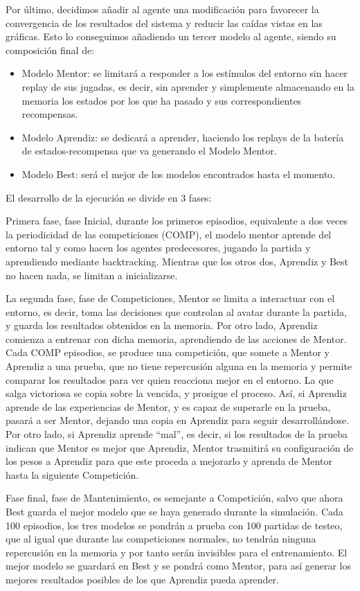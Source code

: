 Por último, decidimos añadir al agente una modificación para favorecer la convergencia de los resultados del sistema y reducir las caídas vistas en las gráficas.
Esto lo conseguimos añadiendo un tercer modelo al agente, siendo su composición final de:
\begin{itemize}
 \item Modelo Mentor: se limitará a responder a los estímulos del entorno sin hacer replay de sus jugadas, es decir, sin aprender y simplemente almacenando en la memoria los estados por los que ha pasado y sus correspondientes recompensas.
 \item Modelo Aprendiz: se dedicará a aprender, haciendo los replays de la batería de estados-recompensa que va generando el Modelo Mentor.
 \item Modelo Best: será el mejor de los modelos encontrados hasta el momento. 
\end{itemize}
El desarrollo de la ejecución se divide en 3 fases:

Primera fase, fase Inicial, durante los primeros episodios, equivalente a dos veces la periodicidad de las competiciones (COMP), el modelo mentor aprende del entorno tal y como hacen los agentes predecesores, jugando la partida y aprendiendo mediante backtracking. Mientras que los otros dos, Aprendiz y Best no hacen nada, se limitan a inicializarse.

La segunda fase, fase de Competiciones, Mentor se limita a interactuar con el entorno, es decir, toma las decisiones que controlan al avatar durante la partida, y guarda los resultados obtenidos en la memoria. Por otro lado, Aprendiz comienza a entrenar con dicha memoria, aprendiendo de las acciones de Mentor.
Cada COMP episodios, se produce una competición, que somete a Mentor y Aprendiz a una prueba, que no tiene repercusión alguna en la memoria y permite comparar los resultados para ver quien reacciona mejor en el entorno. La que salga victoriosa se copia sobre la vencida, y prosigue el proceso.
Así, si Aprendiz aprende de las experiencias de Mentor, y es capaz de superarle en la prueba, pasará a ser Mentor, dejando una copia en Aprendiz para seguir desarrollándose. Por otro lado, si Aprendiz aprende “mal”, es decir, si los resultados de la prueba indican que Mentor es mejor que Aprendiz, Mentor trasmitirá su configuración de los pesos a Aprendiz para que este proceda a mejorarlo y aprenda de Mentor hasta la siguiente Competición.  

Fase final, fase de Mantenimiento, es semejante a Competición, salvo que ahora Best guarda el mejor modelo que se haya generado durante la simulación. Cada 100 episodios, los tres modelos se pondrán a prueba con 100 partidas de testeo, que al igual que durante las competiciones normales, no tendrán ninguna repercusión en la memoria y por tanto serán invisibles para el entrenamiento. El mejor modelo se guardará en Best y se pondrá como Mentor, para así generar los mejores resultados posibles de los que Aprendiz pueda aprender.  

